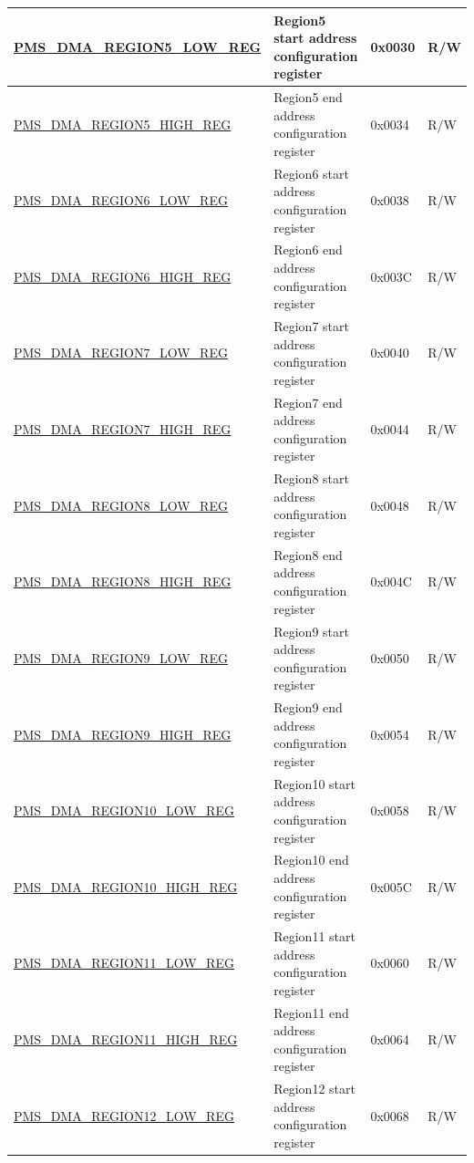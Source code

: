 \begin{longtable}{ | L{7.4cm} | L{6cm} | L{1.3cm} | L{1cm} | }
\hyperref[regdesc:PMSDMAREGIONNLOWREG]{PMS\_DMA\_REGION5\_LOW\_REG} & Region5 start address configuration register & 0x0030 & R/W \\ \hline
\hyperref[regdesc:PMSDMAREGIONNHIGHREG]{PMS\_DMA\_REGION5\_HIGH\_REG} & Region5 end address configuration register & 0x0034 & R/W \\ \hline
\hyperref[regdesc:PMSDMAREGIONNLOWREG]{PMS\_DMA\_REGION6\_LOW\_REG} & Region6 start address configuration register & 0x0038 & R/W \\ \hline
\hyperref[regdesc:PMSDMAREGIONNHIGHREG]{PMS\_DMA\_REGION6\_HIGH\_REG} & Region6 end address configuration register & 0x003C & R/W \\ \hline
\hyperref[regdesc:PMSDMAREGIONNLOWREG]{PMS\_DMA\_REGION7\_LOW\_REG} & Region7 start address configuration register & 0x0040 & R/W \\ \hline
\hyperref[regdesc:PMSDMAREGIONNHIGHREG]{PMS\_DMA\_REGION7\_HIGH\_REG} & Region7 end address configuration register & 0x0044 & R/W \\ \hline
\hyperref[regdesc:PMSDMAREGIONNLOWREG]{PMS\_DMA\_REGION8\_LOW\_REG} & Region8 start address configuration register & 0x0048 & R/W \\ \hline
\hyperref[regdesc:PMSDMAREGIONNHIGHREG]{PMS\_DMA\_REGION8\_HIGH\_REG} & Region8 end address configuration register & 0x004C & R/W \\ \hline
\hyperref[regdesc:PMSDMAREGIONNLOWREG]{PMS\_DMA\_REGION9\_LOW\_REG} & Region9 start address configuration register & 0x0050 & R/W \\ \hline
\hyperref[regdesc:PMSDMAREGIONNHIGHREG]{PMS\_DMA\_REGION9\_HIGH\_REG} & Region9 end address configuration register & 0x0054 & R/W \\ \hline
\hyperref[regdesc:PMSDMAREGIONNLOWREG]{PMS\_DMA\_REGION10\_LOW\_REG} & Region10 start address configuration register & 0x0058 & R/W \\ \hline
\hyperref[regdesc:PMSDMAREGIONNHIGHREG]{PMS\_DMA\_REGION10\_HIGH\_REG} & Region10 end address configuration register & 0x005C & R/W \\ \hline
\hyperref[regdesc:PMSDMAREGIONNLOWREG]{PMS\_DMA\_REGION11\_LOW\_REG} & Region11 start address configuration register & 0x0060 & R/W \\ \hline
\hyperref[regdesc:PMSDMAREGIONNHIGHREG]{PMS\_DMA\_REGION11\_HIGH\_REG} & Region11 end address configuration register & 0x0064 & R/W \\ \hline
\hyperref[regdesc:PMSDMAREGIONNLOWREG]{PMS\_DMA\_REGION12\_LOW\_REG} & Region12 start address configuration register & 0x0068 & R/W \\ \hline

\end{longtable}
